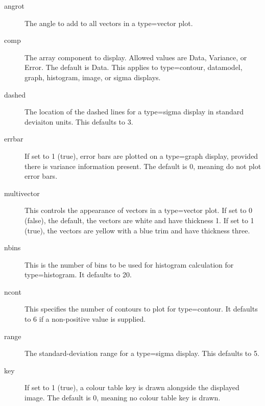 \documentclass[twoside,11pt]{article}
\renewcommand{\_}{\texttt{\symbol{95}}}
\begin{document}
\begin{description}

\item[angrot] \mbox{}

The angle to add to all vectors in a type=vector plot.


\item[comp] \mbox{}

The array component to display.  Allowed values are Data, Variance, or
Error.  The default is Data.  This applies to type=contour, datamodel,
graph, histogram, image, or sigma displays.


\item[dashed] \mbox{}

The location of the dashed lines for a type=sigma display in standard
deviaiton units.  This defaults to 3.


\item[errbar] \mbox{}

If set to 1 (true), error bars are plotted on a type=graph display,
provided there is variance information present.  The default is 0,
meaning do not plot error bars.


\item[multivector] \mbox{}

This controls the appearance of vectors in a type=vector plot.
If set to 0 (false), the default, the vectors are white and have
thickness 1.  If set to 1 (true), the vectors are yellow with a blue
trim and have thickness three.


\item[nbins] \mbox{}

This is the number of bins to be used for histogram calculation for
type=histogram.  It defaults to 20.


\item[ncont] \mbox{}

This specifies the number of contours to plot for type=contour.
It defaults to 6 if a non-positive value is supplied.


\item[range] \mbox{}

The standard-deviation range for a type=sigma display.  This defaults
to 5.


\item[key] \mbox{}

If set to 1 (true), a colour table key is drawn alongside the displayed
image. The default is 0, meaning no colour table key is drawn.

\end{description}
\end{document}
